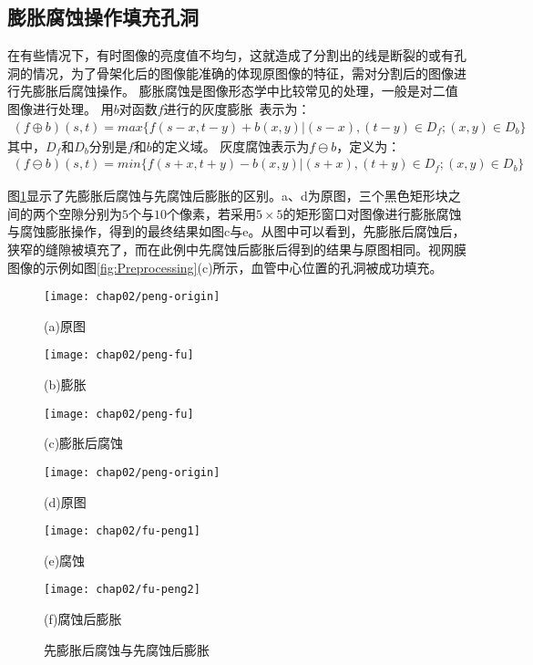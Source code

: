 \subsection{膨胀腐蚀操作填充孔洞}
在有些情况下，有时图像的亮度值不均匀，这就造成了分割出的线是断裂的或有孔洞的情况，为了骨架化后的图像能准确的体现原图像的特征，需对分割后的图像进行先膨胀后腐蚀操作。
膨胀腐蚀是图像形态学中比较常见的处理，一般是对二值图像进行处理。
用$b$对函数$f$进行的灰度膨胀~\cite{gang}表示为：
\begin{align}
(f\oplus b)(s,t)=max\{f(s-x, t-y)+b(x,y)|(s-x),(t-y)\in D_f;(x,y)\in D_b\}
\end{align}
其中，$D_f$和$D_b$分别是$f$和$b$的定义域。
灰度腐蚀表示为$f \ominus b$，定义为：
\begin{align}
(f \ominus b)(s,t)=min\{f(s+x, t+y)-b(x,y)|(s+x),(t+y)\in D_f;(x,y)\in D_b\}
\end{align}

图\ref{fig:peng-fu}显示了先膨胀后腐蚀与先腐蚀后膨胀的区别。a、d为原图，三个黑色矩形块之间的两个空隙分别为$5$个与$10$个像素，若采用$5\times5$的矩形窗口对图像进行膨胀腐蚀与腐蚀膨胀操作，得到的最终结果如图c与e。从图中可以看到，先膨胀后腐蚀后，狭窄的缝隙被填充了，而在此例中先腐蚀后膨胀后得到的结果与原图相同。视网膜图像的示例如图\ref{fig:Preprocessing}(c)所示，血管中心位置的孔洞被成功填充。

\begin{figure}
\centering
  \begin{minipage}[b]{0.3\textwidth} 
      \centering 
      \texttt{[image: chap02/peng-origin]}
        \centerline{(a)原图}\medskip
    \end{minipage}
  \begin{minipage}[b]{0.3\textwidth}
    \centering
    \texttt{[image: chap02/peng-fu]}
      \centerline{(b)膨胀}\medskip
  \end{minipage}
  \begin{minipage}[b]{0.3\textwidth}
    \centering
    \texttt{[image: chap02/peng-fu]}
      \centerline{(c)膨胀后腐蚀}\medskip
  \end{minipage}
   \begin{minipage}[b]{0.3\textwidth} 
      \centering 
      \texttt{[image: chap02/peng-origin]}
        \centerline{(d)原图}\medskip
    \end{minipage}
  \begin{minipage}[b]{0.3\textwidth}
    \centering
    \texttt{[image: chap02/fu-peng1]}
      \centerline{(e)腐蚀}\medskip
  \end{minipage}
  \begin{minipage}[b]{0.3\textwidth}
    \centering
    \texttt{[image: chap02/fu-peng2]}
      \centerline{(f)腐蚀后膨胀}\medskip
  \end{minipage}
\caption{先膨胀后腐蚀与先腐蚀后膨胀}
\label{fig:peng-fu}
\end{figure}

